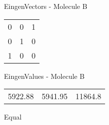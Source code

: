 \begin{multicols}{2}
\begin{center}
\vtab
 EingenVectors - Molecule B     \\
\vtab
\begin{tabular}{|c c c|}
0	 & 	0	 & 	1	 \\
0	 & 	1	 & 	0	 \\
1	 & 	0	 & 	0
\end{tabular}

\vtab
 EingenValues - Molecule B     \\
\vtab
\begin{tabular}{|c c c|}
5922.88	 & 	5941.95	 & 	11864.8	 \\
\end{tabular}

\end{center}
\end{multicols}
\begin{center}
\vtab
\vtab
\textcolor{NavyBlue}{\Large Equal}
\end{center}

 \newpage

